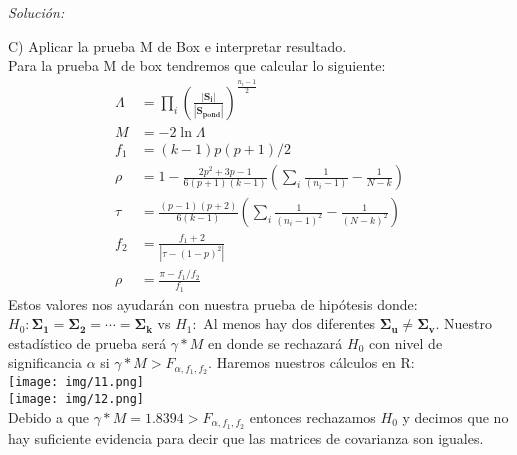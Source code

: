 \documentclass[12pt]{article}
\newenvironment{sol}
    {\emph{Solución:}
    }
    {
    }
\begin{document}
\begin{sol}
\pagebreak

C) Aplicar la prueba M de Box e interpretar resultado.\\
Para la prueba M de box tendremos que calcular lo siguiente:
\begin{align*}
\Lambda &= \prod_{i}(\frac{|\bm{S_i}|}{|\bm{S_{pond}}|})^{\frac{n_i-1}{2}}  \\
M &= -2\ln{\Lambda}\\
f_1 &= (k-1)p(p+1)/2\\
\rho &= 1- \frac{2p^2+3p-1}{6(p+1)(k-1)}(\sum_i\frac{1}{(n_i-1)}-\frac{1}{N-k})\\
\tau &= \frac{(p-1)(p+2)}{6(k-1)}(\sum_i\frac{1}{(n_i-1)^2}-\frac{1}{(N-k)^2})\\
f_2 &= \frac{f_1+2}{|\tau-(1-p)^2|}\\
\rho &= \frac{\pi-f_1/f_2}{f_1}
\end{align*}
Estos valores nos ayudarán con nuestra prueba de hipótesis donde: $H_0:\bm{\Sigma_1=\Sigma_2=\cdots = \Sigma_k}$ vs $H_1:$ Al menos hay dos diferentes $\bm{\Sigma_u} \neq \bm{\Sigma_v}$. Nuestro estadístico de prueba será $\gamma* M$ en donde se rechazará $H_0$ con nivel de significancia $\alpha$ si $\gamma*M>F_{\alpha,f_1,f_2}$. Haremos nuestros cálculos en R:\\
\texttt{[image: img/11.png]}\\
\texttt{[image: img/12.png]}\\
Debido a que $\gamma* M = 1.8394 > F_{\alpha,f_1,f_2}$ entonces rechazamos $H_0$ y decimos que no hay suficiente evidencia para decir que las matrices de covarianza son iguales.
\end{sol}

\end{document}
